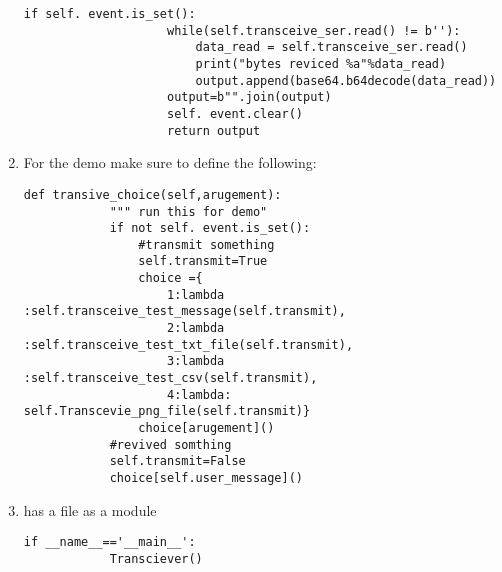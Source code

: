 \begin{enumerate}
\begin{lstlisting}[style=mystyle]
                if self. event.is_set():
                    while(self.transceive_ser.read() != b''):
                        data_read = self.transceive_ser.read()
                        print("bytes reviced %a"%data_read)
                        output.append(base64.b64decode(data_read))
                    output=b"".join(output)
                    self. event.clear()
                    return output
    \end{lstlisting}
    \item For the demo make sure to define the following:
    \begin{lstlisting}[style=mystyle]
        def transive_choice(self,arugement):
            """ run this for demo"
            if not self. event.is_set():
                #transmit something
                self.transmit=True
                choice ={
                    1:lambda :self.transceive_test_message(self.transmit),
                    2:lambda :self.transceive_test_txt_file(self.transmit),
                    3:lambda :self.transceive_test_csv(self.transmit),
                    4:lambda: self.Transcevie_png_file(self.transmit)}
                choice[arugement]()
            #revived somthing
            self.transmit=False
            choice[self.user_message]()
    \end{lstlisting}
    \item has a file as a module
    \begin{lstlisting}[style=mystyle]
        if __name__=='__main__':
	        Transciever()
            
    \end{lstlisting}
\end{enumerate}
